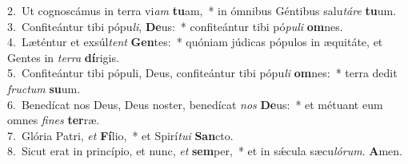 {2.~}Ut cognoscámus in terra vi\textit{am} \textbf{tu}am,~* in ómnibus Géntibus salu\textit{tá}\textit{re} \textbf{tu}um.\\
{3.~}Confiteántur tibi pópu\textit{li}, \textbf{De}us:~* confiteántur tibi pó\textit{pu}\textit{li} \textbf{om}nes.\\
{4.~}Læténtur et exsúl\textit{tent} \textbf{Gen}tes:~* quóniam júdicas pópulos in æquitáte, et Gentes in \textit{ter}\textit{ra} \textbf{dí}rigis.\\
{5.~}Confiteántur tibi pópuli, Deus, confiteántur tibi pópu\textit{li} \textbf{om}nes:~* terra dedit \textit{fru}\textit{ctum} \textbf{su}um.\\
{6.~}Benedícat nos Deus, Deus noster, benedícat \textit{nos} \textbf{De}us:~* et métuant eum omnes \textit{fi}\textit{nes} \textbf{ter}ræ.\\
{7.~}Glória Patri, \textit{et} \textbf{Fí}lio,~* et Spirí\textit{tu}\textit{i} \textbf{San}cto.\\
{8.~}Sicut erat in princípio, et nunc, \textit{et} \textbf{sem}per,~* et in sǽcula sæcu\textit{ló}\textit{rum}. \textbf{A}men.\\
